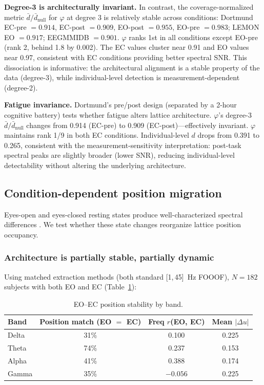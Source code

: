 \documentclass[11pt,a4paper]{article}
\newcommand{\phisym}{\varphi}
\begin{document}
\textbf{Degree-3 is architecturally invariant.} In contrast, the coverage-normalized metric $\bar{d}/\bar{d}_{\text{null}}$ for $\phisym$ at degree 3 is relatively stable across conditions: Dortmund EC-pre $= 0.914$, EC-post $= 0.909$, EO-post $= 0.955$, EO-pre $= 0.983$; LEMON EO $= 0.917$; EEGMMIDB $= 0.901$. $\phisym$ ranks 1st in all conditions except EO-pre (rank 2, behind 1.8 by 0.002). The EC values cluster near 0.91 and EO values near 0.97, consistent with EC conditions providing better spectral SNR. This dissociation is informative: the architectural alignment is a stable property of the data (degree-3), while individual-level detection is measurement-dependent (degree-2).

\textbf{Fatigue invariance.} Dortmund's pre/post design (separated by a 2-hour cognitive battery) tests whether fatigue alters lattice architecture. $\phisym$'s degree-3 $\bar{d}/\bar{d}_{\text{null}}$ changes from 0.914 (EC-pre) to 0.909 (EC-post)---effectively invariant. $\phisym$ maintains rank 1/9 in both EC conditions. Individual-level $d$ drops from 0.391 to 0.265, consistent with the measurement-sensitivity interpretation: post-task spectral peaks are slightly broader (lower SNR), reducing individual-level detectability without altering the underlying architecture.

\subsection{Condition-dependent position migration}
\label{sec:ec_theta}

Eyes-open and eyes-closed resting states produce well-characterized spectral differences \parencite{Barry2007}. We test whether these state changes reorganize lattice position occupancy.

\subsubsection{Architecture is partially stable, partially dynamic}

Using matched extraction methods (both standard [1,\,45]~Hz FOOOF), $N = 182$ subjects with both EO and EC (Table~\ref{tab:position_stability}):

\begin{table}[H]
\centering
\caption{EO--EC position stability by band.}
\label{tab:position_stability}
\begin{tabular}{lccc}
\toprule
Band & Position match (EO $=$ EC) & Freq $r$(EO, EC) & Mean $|\Delta u|$ \\
\midrule
Delta & 31\% & 0.100 & 0.225 \\
Theta & 74\% & 0.237 & 0.153 \\
Alpha & 41\% & 0.388 & 0.174 \\
Gamma & 35\% & $-0.056$ & 0.225 \\
\bottomrule
\end{tabular}
\end{table}
\end{document}
